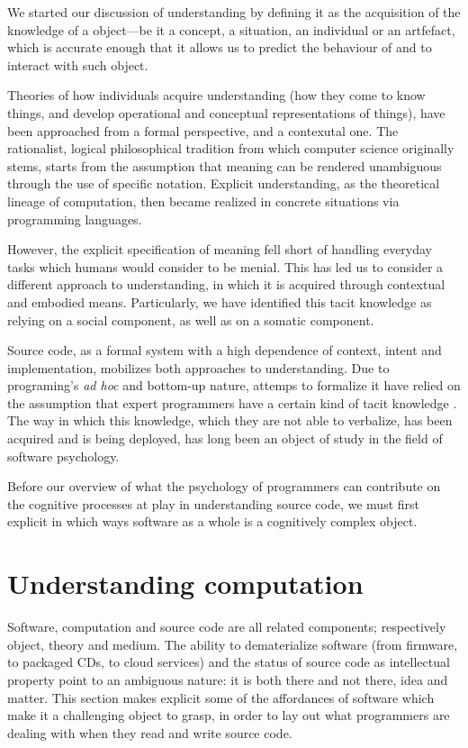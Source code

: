 \spacersmall

We started our discussion of understanding by defining it as the acquisition of the knowledge of a object—be it a concept, a situation, an individual or an artfefact, which is accurate enough that it allows us to predict the behaviour of and to interact with such object.

Theories of how individuals acquire understanding (how they come to know things, and develop operational and conceptual representations of things), have been approached from a formal perspective, and a contexutal one. The rationalist, logical philosophical tradition from which computer science originally stems, starts from the assumption that meaning can be rendered unambiguous through the use of specific notation. Explicit understanding, as the theoretical lineage of computation, then became realized in concrete situations via programming languages.

However, the explicit specification of meaning fell short of handling everyday tasks which humans would consider to be menial. This has led us to consider a different approach to understanding, in which it is acquired through contextual and embodied means. Particularly, we have identified this tacit knowledge as relying on a social component, as well as on a somatic component.

Source code, as a formal system with a high dependence of context, intent and implementation, mobilizes both approaches to understanding. Due to programing's \emph{ad hoc} and bottom-up nature, attemps to formalize it have relied on the assumption that expert programmers have a certain kind of tacit knowledge \citep{soloway1982tapping,soloway_empirical_1984}. The way in which this knowledge, which they are not able to verbalize, has been acquired and is being deployed, has long been an object of study in the field of software psychology.

Before our overview of what the psychology of programmers can contribute on the cognitive processes at play in understanding source code, we must first explicit in which ways software as a whole is a cognitively complex object.

\spacer

\section{Understanding computation}
\label{sec:understanding-computation}

Software, computation and source code are all related components; respectively object, theory and medium. The ability to dematerialize software (from firmware, to packaged CDs, to cloud services) and the status of source code as intellectual property point to an ambiguous nature: it is both there and not there, idea and matter. This section makes explicit some of the affordances of software which make it a challenging object to grasp, in order to lay out what programmers are dealing with when they read and write source code.

